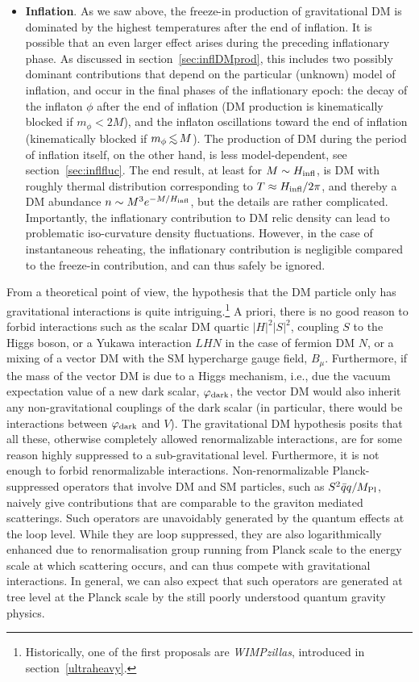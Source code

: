 \begin{itemize}
\item[\scalebox{0.6}{$\blacksquare$}] {\bf Inflation}. As we saw above, the freeze-in production of gravitational DM is dominated by the highest temperatures after the end of inflation. It is possible that an even larger effect arises during the preceding inflationary phase.
As discussed in section~\ref{sec:inflDMprod},
this includes two possibly dominant contributions that depend on the particular (unknown)  model of inflation, and occur in the final phases of the inflationary epoch:
the decay of the inflaton $\phi$ after  the end of inflation (DM production is kinematically blocked if $m_\phi < 2M$),
and the inflaton oscillations toward the end of inflation (kinematically blocked if $m_\phi\circa{<}M$).
The production of DM during the period of inflation itself, on the other hand, is less model-dependent, see section~\ref{sec:inflfluc}.
The end result, at least for $M \sim H_{\rm infl}$, is  DM with roughly thermal distribution corresponding to $T \approx H_{\rm infl}/2\pi$, and thereby a DM abundance $n \sim M^3 e^{-M/H_{\rm infl}}$, but the details are rather complicated. 
Importantly, the inflationary contribution to DM relic density can lead to problematic iso-curvature density fluctuations.
However, in the case of instantaneous reheating, the inflationary contribution is negligible compared to the freeze-in contribution, and can thus  safely be ignored.

\end{itemize}
From a theoretical point of view, the hypothesis that the DM particle only has gravitational interactions is quite intriguing.\footnote{Historically, one of the first proposals are {\em WIMPzillas}, introduced in section~\ref{ultraheavy}.} 
A priori, there is no good reason to forbid interactions such as the scalar DM quartic $|H|^2 |S|^2$, coupling $S$ to the Higgs boson, or a Yukawa interaction $LHN$ in the case of fermion DM $N$, or a mixing of a vector DM with the SM hypercharge gauge field, $B_\mu$.
Furthermore, if the mass of the vector DM is due to a Higgs mechanism, i.e., due the vacuum expectation value of a new dark scalar, $\varphi_{\rm dark}$,
the vector DM would also inherit any non-gravitational couplings of the dark scalar (in particular, there would be interactions between $\varphi_{\rm dark}$ and $V$).
The gravitational DM hypothesis posits that  all these, otherwise completely allowed renormalizable interactions, are for some reason highly suppressed to a sub-gravitational level.
Furthermore, it is not enough to forbid renormalizable interactions. Non-renormalizable Planck-suppressed operators that involve DM and SM particles, such as $S^2 \bar q q/M_{\rm Pl}$, naively give contributions that are comparable to the graviton mediated scatterings. Such operators are unavoidably generated by the quantum effects at the loop level. While they are loop suppressed, they are also logarithmically enhanced due to renormalisation group running from Planck scale to the energy scale at which scattering occurs, and can thus compete with gravitational interactions. 
In general, we can also expect that such operators are generated at tree level at the Planck scale
by the still poorly understood quantum gravity physics.

